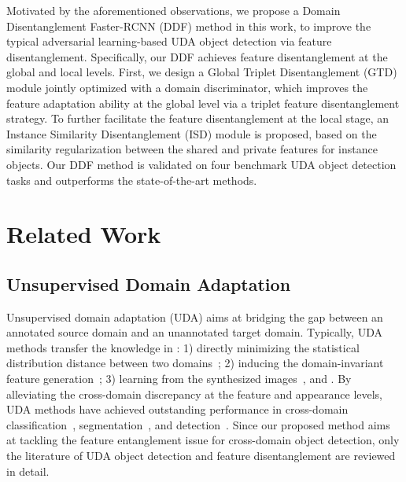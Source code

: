 \documentclass[journal]{IEEEtran}
\begin{document}
Motivated by the aforementioned observations, we propose a Domain Disentanglement Faster-RCNN (DDF) method in this work, to improve the typical adversarial learning-based UDA object detection via feature disentanglement. Specifically, our DDF achieves feature disentanglement at the global and local levels. {\color{black}{Throughout this paper, the global-level features represent the output of the backbone network, which contain the information of the object structure, and spatial distribution for the whole images. The local-level features represent the region of interests (ROIs) for object localization and classification. Domain-invariant features represent the features containing shared factors between the source and target domains, and the instance-invariant features represent the domain-invariant features at the instance-level for the ROIs.}} First, we design a Global Triplet Disentanglement (GTD) module jointly optimized with a domain discriminator, which improves the feature adaptation ability at the global level via a triplet feature disentanglement strategy. To further facilitate the feature disentanglement at the local stage, an Instance Similarity Disentanglement (ISD) module is proposed, based on the similarity regularization between the shared and private features for instance objects. Our DDF method is validated on four benchmark UDA object detection tasks and outperforms the state-of-the-art methods.


\section{Related Work}


\subsection{Unsupervised Domain Adaptation}

Unsupervised domain adaptation (UDA) aims at bridging the gap between an annotated source domain and an unannotated target domain. Typically, UDA methods transfer the knowledge in {\color{black}{four ways}}: 1) directly minimizing the statistical distribution distance between two domains~\cite{gretton2007kernel,fernando2013unsupervised}; 2) inducing the domain-invariant feature generation~\cite{tzeng2017adversarial,ganin2014unsupervised,shermin2020adversarial}; 3) learning from the synthesized images~\cite{zhu2017unpaired,huang2018multimodal,hoffman2017cycada,emami2020spa,liu2020pdam}, and {}. By alleviating the cross-domain discrepancy at the feature and appearance levels, UDA methods have achieved outstanding performance in cross-domain classification~\cite{ganin2014unsupervised,tzeng2017adversarial,hoffman2017cycada}, segmentation~\cite{li2019bidirectional,vu2019advent,liu2020unsupervised}, and detection~\cite{chen2018domain,saito2019strong,inoue2018cross,zhu2019adapting,chen2020harmonizing,he2020domain}. Since our proposed method aims at tackling the feature entanglement issue for cross-domain object detection, only the literature of UDA object detection and feature disentanglement are reviewed in detail.
\end{document}
